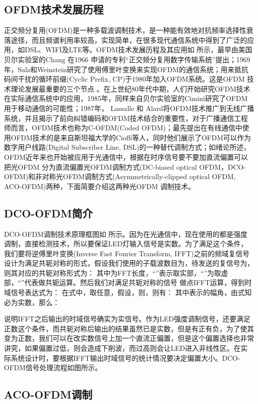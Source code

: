 \subsection{OFDM技术发展历程}
正交频分复用(OFDM)是一种多载波调制技术，是一种能有效地对抗频率选择性衰落途径，而且频谱利用率较高，实现简单，在很多现代通信系统中得到了广泛的应用，如DSL、WIFI及LTE等。OFDM技术发展历程及其应用如
所示，最早由美国贝尔实验室的Chang 在1966 申请的专利“正交频分复用数字传输系统”提出；1969年，Salz和Weinstein研究了使用傅里叶变换来实现OFDM的通信系统；用来抵抗码间干扰的循环前缀(Cyclic Prefix, CP)于1980年加入OFDM系统。这是OFDM 技术理论发展最重要的三个节点
\cite{armstrong2009ofdm}。在上世纪80年代中期，人们开始研究OFDM技术在实际通信系统中的应用，1985年，同样来自贝尔实验室的Cimini研究了OFDM用于移动通信的可能性；1987年， Lassalle 和 Alard将OFDM技术推广到无线广播系统，并且揭示了前向纠错编码和OFDM技术结合的重要性，对于广播通信工程师而言，OFDM技术也称为C-OFDM(Coded OFDM)；最先提出在有线通信中使用OFDM技术的是来自斯坦福大学的Cioffi等人，同时他们展示了OFDM可以作为数字用户线路(Digital Subscriber Line, DSL)的一种替代调制方式；如绪论所述，OFDM近年来也开始被应用于光通信中，根据在时序信号要不要加直流偏置可以把光OFDM 分为直流偏置光OFDM调制方式(DC-biased optical OFDM，DCO-OFDM)和非对称光OFDM调制方式(Asymmetrically-clipped optical OFDM, ACO-OFDM)两种，下面简要介绍这两种光OFDM 调制技术。
\subsection{DCO-OFDM简介}

DCO-OFDM调制技术原理框图如 所示。因为在光通信中，现在使用的都是强度调制，直接检测技术，所以要保证LED灯输入信号是实数。为了满足这个条件，我们要将逆傅里叶变换(Inverse Fast Fourier Transform, IFFT)之前的频域复信号设计为满足共轭对称的形式\cite{proakisdigital}，假设我们使用的子载波数目为，待发送的复信号为，则其对应的共轭对称形式为：
其中为FFT长度，“”表示取实部，“”为取虚部，“”代表做共轭运算。然后我们对满足共轭对称的信号 做点IFFT运算，得到时域信号表达式为：
在式中，取任意，假设，则，则有：
其中表示的幅角，由式知必为实数，那么：

说明IFFT之后输出的时域信号确实为实信号。作为LED强度调制信号，还要满足正数这个条件，而共轭对称后输出的结果虽然已是实数，但是有正有负，为了使其变为正数，我们可以在改实数信号上加一个直流正偏置，但是这个偏置选择也非常讲究，如果偏置过低，则会造成下削波，而过高则会让LED进入非线性区。在实际系统设计时，要根据IFFT输出时域信号的统计情况要决定偏置大小。DCO-OFDM信号处理流程如图所示。

\subsection{ACO-OFDM调制}

